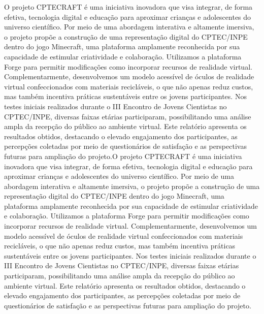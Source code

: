 \begin{resumo}



O projeto CPTECRAFT é uma iniciativa inovadora que visa integrar, de forma efetiva, tecnologia digital e educação para aproximar crianças e adolescentes do universo científico. Por meio de uma abordagem interativa e altamente imersiva, o projeto propõe a construção de uma representação digital do CPTEC/INPE dentro do jogo Minecraft, uma plataforma amplamente reconhecida por sua capacidade de estimular criatividade e colaboração. Utilizamos a plataforma Forge para permitir modificações como incorporar recursos de realidade virtual. Complementarmente, desenvolvemos um modelo acessível de óculos de realidade virtual confeccionados com materiais recicláveis, o que não apenas reduz custos, mas também incentiva práticas sustentáveis entre os jovens participantes. Nos testes iniciais realizados durante o III Encontro de Jovens Cientistas no CPTEC/INPE, diversas faixas etárias participaram, possibilitando uma análise ampla da recepção do público ao ambiente virtual. Este relatório apresenta os resultados obtidos, destacando o elevado engajamento dos participantes, as percepções coletadas por meio de questionários de satisfação e as perspectivas futuras para ampliação do projeto.O projeto CPTECRAFT é uma iniciativa inovadora que visa integrar, de forma efetiva, tecnologia digital e educação para aproximar crianças e adolescentes do universo científico. Por meio de uma abordagem interativa e altamente imersiva, o projeto propõe a construção de uma representação digital do CPTEC/INPE dentro do jogo Minecraft, uma plataforma amplamente reconhecida por sua capacidade de estimular criatividade e colaboração. Utilizamos a plataforma Forge para permitir modificações como incorporar recursos de realidade virtual. Complementarmente, desenvolvemos um modelo acessível de óculos de realidade virtual confeccionados com materiais recicláveis, o que não apenas reduz custos, mas também incentiva práticas sustentáveis entre os jovens participantes. Nos testes iniciais realizados durante o III Encontro de Jovens Cientistas no CPTEC/INPE, diversas faixas etárias participaram, possibilitando uma análise ampla da recepção do público ao ambiente virtual. Este relatório apresenta os resultados obtidos, destacando o elevado engajamento dos participantes, as percepções coletadas por meio de questionários de satisfação e as perspectivas futuras para ampliação do projeto.

\end{resumo}